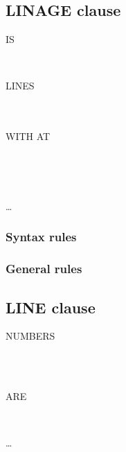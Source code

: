 \subsection{LINAGE clause}
\begin{syntax}
   IS
  \begin{1=}
    \identifier \\
    \literal
  \end{1=}
  LINES
  \begin{0-1}
    \begin{1=}
       \\
       \\
      WITH  AT
    \end{1=}
    \begin{1=}
      \identifier \\
      \literal
    \end{1=} \\
  \end{0-1}
  \ldots \\
\end{syntax}

\subsubsection{Syntax rules}

\subsubsection{General rules}

\subsection{LINE clause}

\begin{syntax}
  \begin{1=}
     NUMBERS
    \begin{0-1}
       \\
    \end{0-1} \\

     ARE
  \end{1=}
  \begin{1=}
    \begin{0-1}
    \end{0-1}
    \integer \\
     
  \end{1=}\ldots
\end{syntax}

